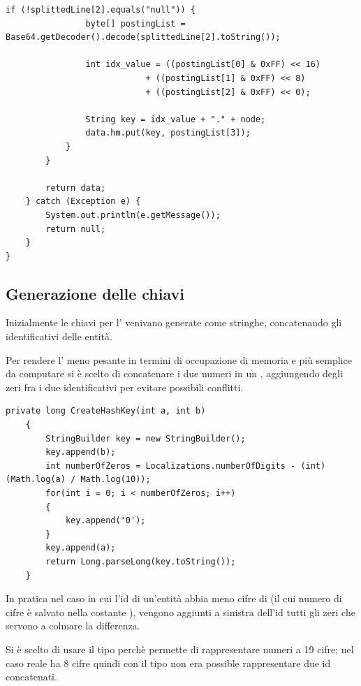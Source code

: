 \begin{lstlisting}[style=JavaStyle, caption=Implentazione con HashMap]
            if (!splittedLine[2].equals("null")) {
                byte[] postingList = Base64.getDecoder().decode(splittedLine[2].toString());

                int idx_value = ((postingList[0] & 0xFF) << 16)
                            + ((postingList[1] & 0xFF) << 8)
                            + ((postingList[2] & 0xFF) << 0);

                String key = idx_value + "." + node;
                data.hm.put(key, postingList[3]);
            }
        }

        return data;
    } catch (Exception e) {
        System.out.println(e.getMessage());
        return null;
    }
}
\end{lstlisting}

\subsection{Generazione delle chiavi}
Inizialmente le chiavi per l' venivano generate come stringhe, concatenando gli identificativi delle entità. 

Per rendere l' meno pesante in termini di occupazione di memoria e più semplice da computare si è scelto di concatenare i due numeri in un , 
aggiungendo degli zeri fra i due identificativi per evitare possibili conflitti.

\begin{lstlisting}[style=JavaStyle, caption=Codice di generazione delle chiavi]
    private long CreateHashKey(int a, int b)
    {
        StringBuilder key = new StringBuilder();
        key.append(b);
        int numberOfZeros = Localizations.numberOfDigits - (int)(Math.log(a) / Math.log(10));
        for(int i = 0; i < numberOfZeros; i++)
        {
            key.append('0');
        }
        key.append(a);
        return Long.parseLong(key.toString());
    }
\end{lstlisting}

In pratica nel caso in cui l'id di un'entità abbia meno cifre di  (il cui numero di cifre è salvato nella costante ),
vengono aggiunti a sinistra dell'id tutti gli zeri che servono a colmare la differenza.

Si è scelto di usare il tipo  perchè permette di rappresentare numeri a 19 cifre; nel caso reale  ha 8 cifre quindi con il tipo  non era 
possible rappresentare due id concatenati. 


